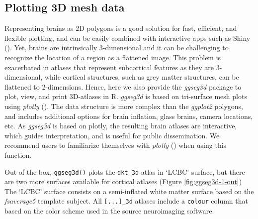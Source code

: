 \documentclass[fleqn,10pt]{wlpeerj} %
\begin{document}
\hypertarget{plotting-3d-mesh-data}{%
\subsection{Plotting 3D mesh data}\label{plotting-3d-mesh-data}}

Representing brains as 2D polygons is a good solution for fast, efficient, and flexible plotting, and can be easily combined with interactive apps such as Shiny (\citet{shiny}).
Yet, brains are intrinsically 3-dimensional and it can be challenging to recognize the location of a region as a flattened image.
This problem is exacerbated in atlases that represent subcortical features as they are 3-dimensional, while cortical structures, such as grey matter structures, can be flattened to 2-dimensions.
Hence, here we also provide the \emph{ggseg3d} package to plot, view, and print 3D-atlases in R.
\emph{ggseg3d} is based on tri-surface mesh plots using \emph{plotly} (\citet{plotly}).
The data structure is more complex than the \emph{ggplot2} polygons, and includes additional options for brain inflation, glass brains, camera locations, etc.
As \emph{ggseg3d} is based on plotly, the resulting brain atlases are interactive, which guides interpretation, and is useful for public dissemination.
We recommend users to familiarize themselves with \emph{plotly} (\citet{plotly}) when using this function.

Out-of-the-box, \texttt{ggseg3d()} plots the \texttt{dkt\_3d} atlas in `LCBC' surface, but there are two more surfaces available for cortical atlases (Figure \ref{fig:ggseg3d-1-out})
The `LCBC' surface consists on a semi-inflated white matter surface based on the \emph{fsaverage5} template subject.
All \texttt{{[}...{]}\_3d} atlases include a \texttt{colour} column that based on the color scheme used in the source neuroimaging software.
\end{document}
